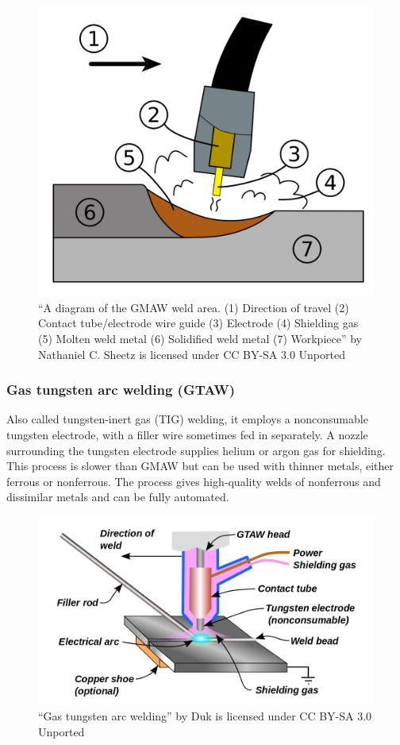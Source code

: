 \documentclass[
10pt,
a4paper,
openany,
svgnames,
]{book}
\begin{document}
\begin{figure}[h]
  \centering
  \includegraphics[scale=0.1]{pictures/Welding/gas-metal-arc-welding}
  \caption[A diagram of GMAW weld area]{``A diagram of the GMAW weld area. (1) Direction of travel (2)  Contact tube/electrode wire guide (3) Electrode (4)  Shielding gas (5) Molten weld metal (6) Solidified weld metal (7) Workpiece'' by Nathaniel C. Sheetz is licensed under CC BY-SA 3.0 Unported}
\end{figure}
  
\subsubsection{Gas tungsten arc welding (GTAW)}
Also called tungsten-inert gas (TIG) welding, it employs a nonconsumable tungsten electrode, with a filler wire sometimes fed in separately. A nozzle surrounding the tungsten electrode supplies helium or argon gas for shielding. This process is slower than GMAW but can be used with thinner metals, either ferrous or nonferrous. The process gives high-quality welds of nonferrous and dissimilar metals and can be fully automated.

\begin{figure}[h]
  \centering
  \includegraphics[scale=0.35]{pictures/Welding/gas-tungsten-arc-welding}
  \caption[Gas tungsten arc welding]{``Gas tungsten arc welding'' by Duk is licensed under CC BY-SA 3.0 Unported}
\end{figure}
 
\end{document}
